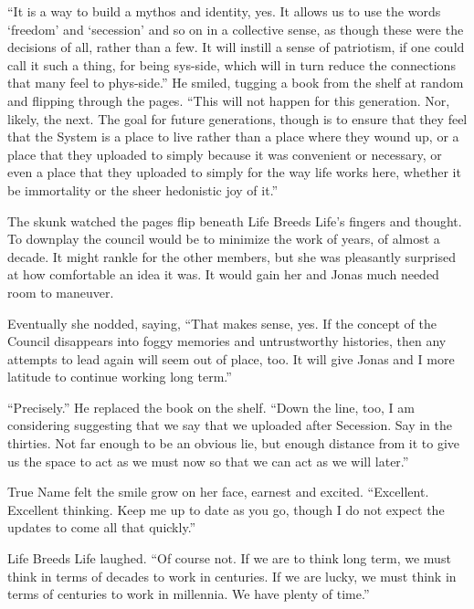 ``It is a way to build a mythos and identity, yes. It allows us to use the words `freedom' and `secession' and so on in a collective sense, as though these were the decisions of all, rather than a few. It will instill a sense of patriotism, if one could call it such a thing, for being sys-side, which will in turn reduce the connections that many feel to phys-side.'' He smiled, tugging a book from the shelf at random and flipping through the pages. ``This will not happen for this generation. Nor, likely, the next. The goal for future generations, though is to ensure that they feel that the System is a place to live rather than a place where they wound up, or a place that they uploaded to simply because it was convenient or necessary, or even a place that they uploaded to simply for the way life works here, whether it be immortality or the sheer hedonistic joy of it.''

The skunk watched the pages flip beneath Life Breeds Life's fingers and thought. To downplay the council would be to minimize the work of years, of almost a decade. It might rankle for the other members, but she was pleasantly surprised at how comfortable an idea it was. It would gain her and Jonas much needed room to maneuver.

Eventually she nodded, saying, ``That makes sense, yes. If the concept of the Council disappears into foggy memories and untrustworthy histories, then any attempts to lead again will seem out of place, too. It will give Jonas and I more latitude to continue working long term.''

``Precisely.'' He replaced the book on the shelf. ``Down the line, too, I am considering suggesting that we say that we uploaded after Secession. Say in the thirties. Not far enough to be an obvious lie, but enough distance from it to give us the space to act as we must now so that we can act as we will later.''

True Name felt the smile grow on her face, earnest and excited. ``Excellent. Excellent thinking. Keep me up to date as you go, though I do not expect the updates to come all that quickly.''

Life Breeds Life laughed. ``Of course not. If we are to think long term, we must think in terms of decades to work in centuries. If we are lucky, we must think in terms of centuries to work in millennia. We have plenty of time.''
